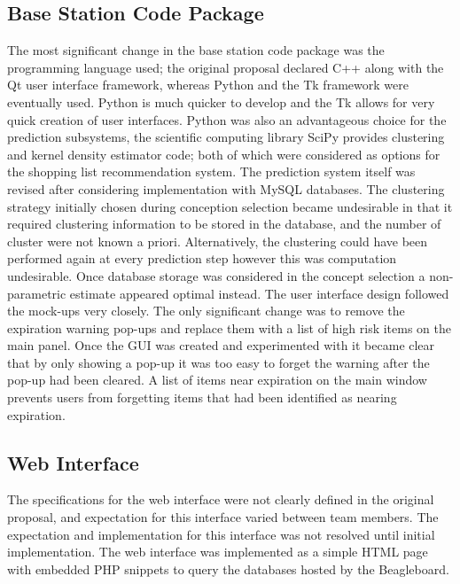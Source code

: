 \documentclass[11pt]{article} %
\begin{document}
\subsection{Base Station Code Package}
The most significant change in the base station code package was the programming language used; the original proposal declared C++ along with the Qt user interface framework, whereas Python and the Tk framework were eventually used. Python is much quicker to develop and the Tk allows for very quick creation of user interfaces. Python was also an advantageous choice for the prediction subsystems, the scientific computing library SciPy provides clustering and kernel density estimator code; both of which were considered as options for the shopping list recommendation system. The prediction system itself was revised after considering implementation with MySQL databases. The clustering strategy initially chosen during conception selection became undesirable in that it required clustering information to be stored in the database, and the number of cluster were not known a priori. Alternatively, the clustering could have been performed again at every prediction step however this was computation undesirable. Once database storage was considered in the concept selection a non-parametric estimate appeared optimal instead.
\newline \quad \newline
The user interface design followed the mock-ups very closely. The only significant change was to remove the expiration warning pop-ups and replace them with a list of high risk items on the main panel. Once the GUI was created and experimented with it became clear that by only showing a pop-up it was too easy to forget the warning after the pop-up had been cleared. A list of items near expiration on the main window prevents users from forgetting items that had been identified as nearing expiration.
\subsection{Web Interface}
The specifications for the web interface were not clearly defined in the original proposal, and expectation for this interface varied between team members. The expectation and implementation for this interface was not resolved until initial implementation. The web interface was implemented as a simple HTML page with embedded PHP snippets to query the databases hosted by the Beagleboard.
\end{document}
